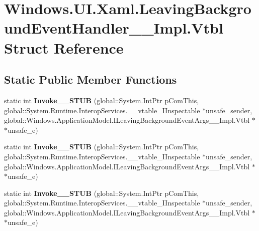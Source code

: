 \hypertarget{struct_windows_1_1_u_i_1_1_xaml_1_1_leaving_background_event_handler_____impl_1_1_vtbl}{}\section{Windows.\+U\+I.\+Xaml.\+Leaving\+Background\+Event\+Handler\+\_\+\+\_\+\+Impl.\+Vtbl Struct Reference}
\label{struct_windows_1_1_u_i_1_1_xaml_1_1_leaving_background_event_handler_____impl_1_1_vtbl}
\subsection*{Static Public Member Functions}
\begin{DoxyCompactItemize}
\item 
\mbox{\label{struct_windows_1_1_u_i_1_1_xaml_1_1_leaving_background_event_handler_____impl_1_1_vtbl_afc344beaad924cbce2c91b661fd56de0}} 
static int {\bfseries Invoke\+\_\+\+\_\+\+S\+T\+UB} (global\+::\+System.\+Int\+Ptr p\+Com\+This, global\+::\+System.\+Runtime.\+Interop\+Services.\+\_\+\+\_\+vtable\+\_\+\+I\+Inspectable $\ast$unsafe\+\_\+sender, global\+::\+Windows.\+Application\+Model.\+I\+Leaving\+Background\+Event\+Args\+\_\+\+\_\+\+Impl.\+Vtbl $\ast$$\ast$unsafe\+\_\+e)
\item 
\mbox{\label{struct_windows_1_1_u_i_1_1_xaml_1_1_leaving_background_event_handler_____impl_1_1_vtbl_afc344beaad924cbce2c91b661fd56de0}} 
static int {\bfseries Invoke\+\_\+\+\_\+\+S\+T\+UB} (global\+::\+System.\+Int\+Ptr p\+Com\+This, global\+::\+System.\+Runtime.\+Interop\+Services.\+\_\+\+\_\+vtable\+\_\+\+I\+Inspectable $\ast$unsafe\+\_\+sender, global\+::\+Windows.\+Application\+Model.\+I\+Leaving\+Background\+Event\+Args\+\_\+\+\_\+\+Impl.\+Vtbl $\ast$$\ast$unsafe\+\_\+e)
\item 
\mbox{\label{struct_windows_1_1_u_i_1_1_xaml_1_1_leaving_background_event_handler_____impl_1_1_vtbl_afc344beaad924cbce2c91b661fd56de0}} 
static int {\bfseries Invoke\+\_\+\+\_\+\+S\+T\+UB} (global\+::\+System.\+Int\+Ptr p\+Com\+This, global\+::\+System.\+Runtime.\+Interop\+Services.\+\_\+\+\_\+vtable\+\_\+\+I\+Inspectable $\ast$unsafe\+\_\+sender, global\+::\+Windows.\+Application\+Model.\+I\+Leaving\+Background\+Event\+Args\+\_\+\+\_\+\+Impl.\+Vtbl $\ast$$\ast$unsafe\+\_\+e)
$$
\end{DoxyCompactItemize}
